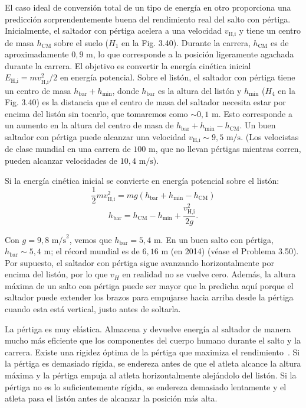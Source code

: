 \documentclass[12pt]{book}
\begin{document}
El caso ideal de conversión total de un tipo de energía en otro proporciona una predicción sorprendentemente buena del rendimiento real del salto con pértiga. Inicialmente, el saltador con pértiga acelera a una velocidad $v_{\text{H,i}}$ y tiene un centro de masa $h_{\text{CM}}$ sobre el suelo ($H_1$ en la Fig. 3.40). Durante la carrera, $h_{\text{CM}}$ es de aproximadamente $0,9\text{ m}$, lo que corresponde a la posición ligeramente agachada durante la carrera. El objetivo es convertir la energía cinética inicial $E_{\text{H,i}} = m v_{\text{H,i}}^2 / 2$ en energía potencial. Sobre el listón, el saltador con pértiga tiene un centro de masa $h_{\text{bar}} + h_{\text{min}}$, donde $h_{\text{bar}}$ es la altura del listón y $h_{\text{min}}$ ($H_4$ en la Fig. 3.40) es la distancia que el centro de masa del saltador necesita estar por encima del listón sin tocarlo, que tomaremos como $\sim 0,1\text{ m}$. Esto corresponde a un aumento en la altura del centro de masa de $h_{\text{bar}} + h_{\text{min}} - h_{\text{CM}}$. Un buen saltador con pértiga puede alcanzar una velocidad $v_{\text{H,i}} \sim 9,5\text{ m/s}$. (Los velocistas de clase mundial en una carrera de $100\text{ m}$, que no llevan pértigas mientras corren, pueden alcanzar velocidades de $10,4\text{ m/s}$).

Si la energía cinética inicial se convierte en energía potencial sobre el listón:
\begin{equation}
\frac{1}{2} m v_{\text{H,i}}^2 = m g (h_{\text{bar}} + h_{\text{min}} - h_{\text{CM}})
\label{eq:3.61}
\end{equation}
\begin{equation}
h_{\text{bar}} = h_{\text{CM}} - h_{\text{min}} + \frac{v_{\text{H,i}}^2}{2g}.
\label{eq:3.62}
\end{equation}


Con $g = 9{,}8\text{ m/s}^2$, vemos que $h_{\text{bar}} = 5{,}4\text{ m}$. En un buen salto con pértiga, $h_{\text{bar}} \sim 5{,}4\text{ m}$; el récord mundial es de $6{,}16\text{ m}$ (en 2014) (véase el Problema 3.50). Por supuesto, el saltador con pértiga sigue avanzando horizontalmente por encima del listón, por lo que $v_H$ en realidad no se vuelve cero. Además, la altura máxima de un salto con pértiga puede ser mayor que la predicha aquí porque el saltador puede extender los brazos para empujarse hacia arriba desde la pértiga cuando esta está vertical, justo antes de soltarla.

La pértiga es muy elástica. Almacena y devuelve energía al saltador de manera mucho más eficiente que los componentes del cuerpo humano durante el salto y la carrera. Existe una rigidez óptima de la pértiga que maximiza el rendimiento~\cite{ref134}. Si la pértiga es demasiado rígida, se endereza antes de que el atleta alcance la altura máxima y la pértiga empuja al atleta horizontalmente alejándolo del listón. Si la pértiga no es lo suficientemente rígida, se endereza demasiado lentamente y el atleta pasa el listón antes de alcanzar la posición más alta.
\end{document}
